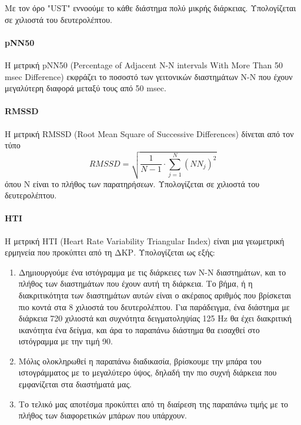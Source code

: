 Με τον όρο "UST" εννοούμε το κάθε διάστημα πολύ μικρής διάρκειας. Υπολογίζεται σε χιλιοστά του δευτερολέπτου.

\paragraph{pNN50}
Η μετρική pNN50 (Percentage of Adjacent N-N intervals With More Than 50 msec Difference)   εκφράζει το ποσοστό των γειτονικών διαστημάτων Ν-Ν που έχουν μεγαλύτερη διαφορά μεταξύ τους από 50 msec.

\paragraph{RMSSD}
Η μετρική RMSSD (Root Mean Square of Successive Differences) δίνεται από τον τύπο 
\begin{equation}
\label{eq:RMSSD}
   RMSSD = \sqrt{\frac{1}{N-1}\cdot\sum_{j=1}^N(NN_j)^2}
\end{equation}
όπου Ν είναι το πλήθος των παρατηρήσεων. Υπολογίζεται σε χιλιοστά του δευτερολέπτου.

\paragraph{HTI}
Η μετρική HTI (Heart Rate Variability Triangular Index) είναι μια γεωμετρική ερμηνεία που προκύπτει από τη ΔΚΡ. Υπολογίζεται ως εξής:
\begin{enumerate}
    \item Δημιουργούμε ένα ιστόγραμμα με τις διάρκειες των Ν-Ν διαστημάτων, και το πλήθος των διαστημάτων που έχουν αυτή τη διάρκεια. Το βήμα, ή η διακριτικότητα των διαστημάτων αυτών είναι ο ακέραιος αριθμός που βρίσκεται πιο κοντά στα 8 χιλιοστά του δευτερολέπτου. Για παράδειγμα, ένα διάστημα με διάρκεια 720 χιλιοστά και συχνότητα δειγματοληψίας 125 Hz θα έχει διακριτική ικανότητα ένα δείγμα, και άρα το παραπάνω διάστημα θα εισαχθεί στο ιστόγραμμα με την τιμή 90.
    \item Μόλις ολοκληρωθεί η παραπάνω διαδικασία, βρίσκουμε την μπάρα του ιστογράμματος με το μεγαλύτερο ύψος, δηλαδή την πιο συχνή διάρκεια που εμφανίζεται στα διαστήματά μας.
    \item Το τελικό μας αποτέσμα προκύπτει από τη διαίρεση της παραπάνω τιμής με το πλήθος των διαφορετικών μπάρων που υπάρχουν.
\end{enumerate}

